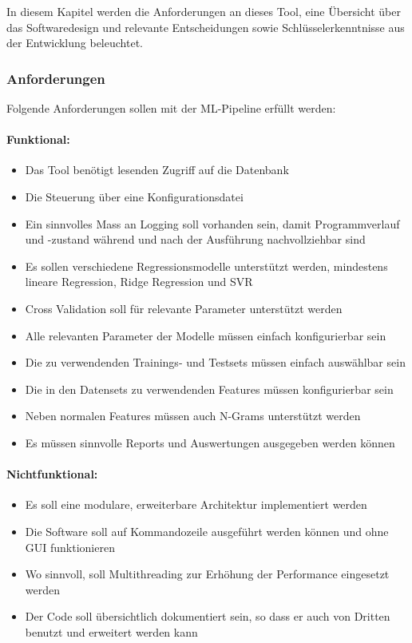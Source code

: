 \documentclass[10pt, a4paper]{article}
\begin{document}
In diesem Kapitel werden die Anforderungen an dieses Tool, eine Übersicht über das Softwaredesign und relevante Entscheidungen sowie Schlüs\-sel\-er\-kennt\-nis\-se aus der Entwicklung beleuchtet.

\subsubsection{Anforderungen}

Folgende Anforderungen sollen mit der ML-Pipeline erfüllt werden:

\paragraph{Funktional:}
\begin{itemize}
	\item Das Tool benötigt lesenden Zugriff auf die Datenbank
	\item Die Steuerung über eine Konfigurationsdatei
	\item Ein sinnvolles Mass an Logging soll vorhanden sein, damit Programmverlauf und -zustand während und nach der Ausführung nachvollziehbar sind
	\item Es sollen verschiedene Regressionsmodelle unterstützt werden, mindestens lineare Regression, Ridge Regression und \ac{SVR}
	\item Cross Validation soll für relevante Parameter unterstützt werden
	\item Alle relevanten Parameter der Modelle müssen einfach konfigurierbar sein
	\item Die zu verwendenden Trainings- und Testsets müssen einfach auswählbar sein
	\item Die in den Datensets zu verwendenden Features müssen konfigurierbar sein
	\item Neben normalen Features müssen auch N-Grams unterstützt werden
	\item Es müssen sinnvolle Reports und Auswertungen ausgegeben werden kön\-nen
\end{itemize}


\paragraph{Nichtfunktional:}
\begin{itemize}
	\item Es soll eine modulare, erweiterbare Architektur implementiert werden
	\item Die Software soll auf Kommandozeile ausgeführt werden können und ohne GUI funktionieren
	\item Wo sinnvoll, soll Multithreading zur Erhöhung der Performance eingesetzt werden
	\item Der Code soll übersichtlich dokumentiert sein, so dass er auch von Dritten benutzt und erweitert werden kann
\end{itemize}
\end{document}
